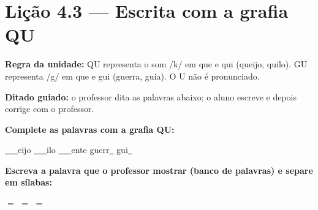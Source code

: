 \section{Lição 4.3 --- Escrita com a grafia QU}

\noindent\textbf{Regra da unidade:} QU representa o som /k/ em que e qui (queijo, quilo). GU representa /g/ em que e gui (guerra, guia). O U não é pronunciado.


\noindent\textbf{Ditado guiado:} o professor dita as palavras abaixo; o aluno escreve e depois corrige com o professor.

\begin{center}
  \underline{\hspace{2.3cm}} \quad \underline{\hspace{2.3cm}} \quad \underline{\hspace{2.3cm}} \quad \underline{\hspace{2.3cm}}

  \underline{\hspace{2.3cm}} \quad \underline{\hspace{2.3cm}} \quad \underline{\hspace{2.3cm}} \quad \underline{\hspace{2.3cm}}
\end{center}

\noindent\textbf{Complete as palavras com a grafia QU:}
\begin{center}
  \underline{~~~}eijo \quad \underline{~~~}ilo \quad \underline{~~~}ente \quad guerr\underline{~} \quad gui\underline{~}
\end{center}

\noindent\textbf{Escreva a palavra que o professor mostrar (banco de palavras) e separe em sílabas:}

\begin{center}
  \underline{\hspace{2cm}} $=$ \underline{\hspace{2cm}} \quad \underline{\hspace{2cm}} $=$ \underline{\hspace{2cm}} \quad \underline{\hspace{2cm}} $=$ \underline{\hspace{2cm}}
  \end{center}



